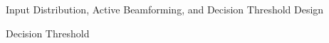 \documentclass[journal]{IEEEtran}
\newtheorem{proposition}{Proposition}
\begin{document}
\begin{section}{Input Distribution, Active Beamforming, and Decision Threshold Design}
\begin{subsection}{Decision Threshold}



	\end{subsection}
\end{section}
\end{document}
